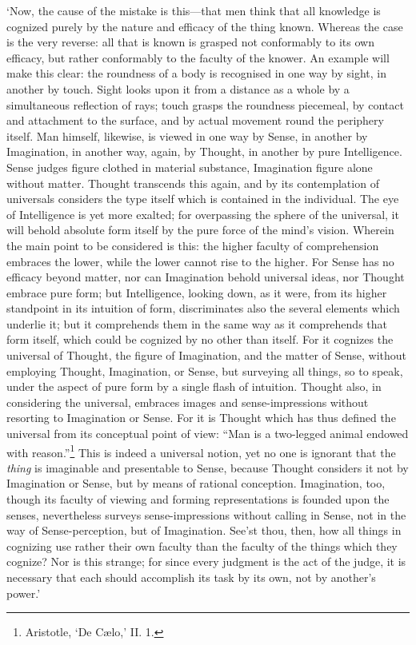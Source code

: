 \documentclass[12pt]{book}
\begin{document}
`Now, the cause of the mistake is this---that men think that all
knowledge is cognized purely by the nature and efficacy of the thing
known. Whereas the case is the very reverse: all that is known is
grasped not conformably to its own efficacy, but rather conformably to
the faculty of the knower. An example will make this clear: the
roundness of a body is recognised in one way by sight, in another by
touch. Sight looks upon it from a distance as a whole by a simultaneous
reflection of rays; touch grasps the roundness piecemeal, by contact and
attachment to the surface, and by actual movement round the periphery
itself. Man himself, likewise, is viewed in one way by Sense, in another
by Imagination, in another way, again, by Thought, in another by pure
Intelligence. Sense judges figure clothed in material substance,
Imagination figure alone without matter. Thought transcends this again,
and by its contemplation of universals considers the type itself which
is contained in the individual. The eye of Intelligence is yet more
exalted; for overpassing the sphere of the universal, it will behold
absolute form itself by the pure force of the mind's vision. Wherein the
main point to be considered is this: the higher faculty of comprehension
embraces the lower, while the lower cannot rise to the higher. For Sense
has no efficacy beyond matter, nor can Imagination behold universal
ideas, nor Thought embrace pure form; but Intelligence, looking down, as
it were, from its higher standpoint in its intuition of form,
discriminates also the several elements which underlie it; but it
comprehends them in the same way as it comprehends that form itself,
which could be cognized by no other than itself. For it cognizes the
universal of Thought, the figure of Imagination, and the matter of
Sense, without employing Thought, Imagination, or Sense, but surveying
all things, so to speak, under the aspect of pure form by a single flash
of intuition. Thought also, in considering the universal, embraces
images and sense-impressions without resorting to Imagination or Sense.
For it is Thought which has thus defined the universal from its
conceptual point of view: ``Man is a two-legged animal endowed with
reason.''\footnote{Aristotle, `De Cælo,’ II. 1.} This is indeed a universal notion, yet no one is ignorant that
the \emph{thing} is imaginable and presentable to Sense, because Thought
considers it not by Imagination or Sense, but by means of rational
conception. Imagination, too, though its faculty of viewing and forming
representations is founded upon the senses, nevertheless surveys
sense-impressions without calling in Sense, not in the way of
Sense-perception, but of Imagination. See'st thou, then, how all things
in cognizing use rather their own faculty than the faculty of the things
which they cognize? Nor is this strange; for since every judgment is the
act of the judge, it is necessary that each should accomplish its task
by its own, not by another's power.'
\end{document}
